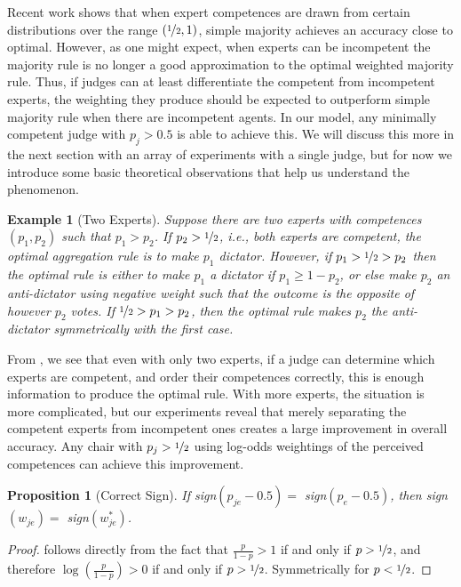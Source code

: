 \documentclass[letterpaper]{article} %
\newtheorem{proposition}{Proposition}
\newtheorem{example}{Example}
\newcommand{\judge}{\ensuremath{j} }
\newcommand{\expert}{\ensuremath{e} }
\begin{document}
Recent work \cite{baharad2022one} shows that when expert competences are drawn from certain distributions over the range $(\nicefrac{1}{2}, 1)$, simple majority achieves an accuracy close to optimal.
%
However, as one might expect, when experts can be incompetent the majority rule is no longer a good approximation to the optimal weighted majority rule.
%
Thus, if judges can at least differentiate the competent from incompetent experts, the weighting they produce should be expected to outperform simple majority rule when there are incompetent agents. In our model, any minimally competent judge with $p_j > 0.5$ is able to achieve this.
%
We will discuss this more in the next section with an array of experiments with a single judge, but for now we introduce some basic theoretical observations that help us understand the phenomenon.

 \begin{example}[Two Experts]\label{example:two_experts}
 Suppose there are two experts with competences $(p_1, p_2)$ such that $p_1 > p_2$. If $p_2 > \nicefrac{1}{2}$, i.e., both experts are competent, the optimal aggregation rule is to make $p_1$ dictator. However, if $p_1 > \nicefrac{1}{2} > p_2$ then the optimal rule is either to make $p_1$ a dictator if $p_1 \geq 1 - p_2$, or else make $p_2$ an anti-dictator using negative weight such that the outcome is the opposite of however $p_2$ votes. If $\nicefrac{1}{2} > p_1 > p_2$, then the optimal rule makes $p_2$ the anti-dictator symmetrically with the first case.
 \end{example}

 From , we see that even with only two experts, if a judge can determine which experts are competent, and order their competences correctly, this is enough information to produce the optimal rule. With more experts, the situation is more complicated, but our experiments reveal that merely separating the competent experts from incompetent ones creates a large improvement in overall accuracy. Any chair with $p_j > \nicefrac{1}{2}$ using log-odds weightings of the perceived competences can achieve this improvement.

\begin{proposition}[Correct Sign]\label{prop:single_j_correct_sign}
 If sign$(p_{\judge \expert} - 0.5) = $ sign$(p_{\expert}-0.5)$, then sign$(w_{\judge \expert}) = $ sign$(w^*_{\judge \expert})$.
\end{proposition}

\begin{proof}
  follows directly from the fact that $\frac{p}{1-p} > 1$ if and only if $p > \nicefrac{1}{2}$, and therefore $\log(\frac{p}{1-p}) > 0$ if and only if $p > \nicefrac{1}{2}$. Symmetrically for $p < \nicefrac{1}{2}$.
\end{proof}
\end{document}
